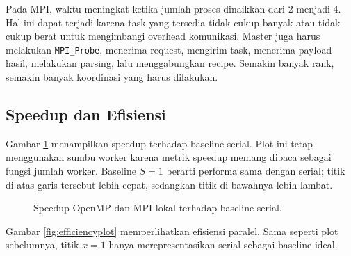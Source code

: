 \documentclass[conference]{IEEEtran}
\begin{document}
Pada MPI, waktu meningkat ketika jumlah proses dinaikkan dari 2 menjadi 4. Hal ini dapat terjadi karena task yang tersedia tidak cukup banyak atau tidak cukup berat untuk mengimbangi overhead komunikasi. Master juga harus melakukan \texttt{MPI\_Probe}, menerima request, mengirim task, menerima payload hasil, melakukan parsing, lalu menggabungkan recipe. Semakin banyak rank, semakin banyak koordinasi yang harus dilakukan.

\subsection{Speedup dan Efisiensi}

Gambar \ref{fig:speedupplot} menampilkan speedup terhadap baseline serial. Plot ini tetap menggunakan sumbu worker karena metrik speedup memang dibaca sebagai fungsi jumlah worker. Baseline \(S=1\) berarti performa sama dengan serial; titik di atas garis tersebut lebih cepat, sedangkan titik di bawahnya lebih lambat.

\begin{figure}[!t]
\centering
{}
\caption{Speedup OpenMP dan MPI lokal terhadap baseline serial.}
\label{fig:speedupplot}
\end{figure}

Gambar \ref{fig:efficiencyplot} memperlihatkan efisiensi paralel. Sama seperti plot sebelumnya, titik \(x=1\) hanya merepresentasikan serial sebagai baseline ideal.
\end{document}
